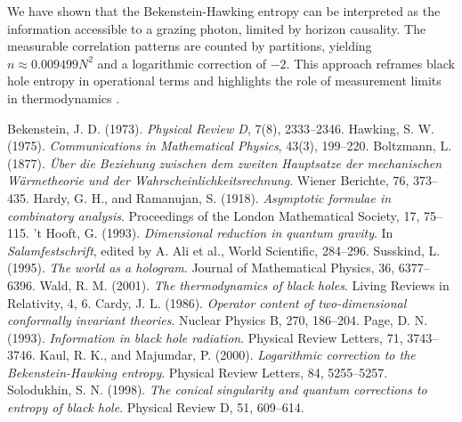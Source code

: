 \documentclass[12pt, letterpaper]{article}
\begin{document}
We have shown that the Bekenstein-Hawking entropy can be interpreted as the information accessible to a grazing photon, limited by horizon causality. The measurable correlation patterns are counted by partitions, yielding $n \approx 0.009499 N^2$ and a logarithmic correction of $-2$. This approach reframes black hole entropy in operational terms and highlights the role of measurement limits in thermodynamics \cite{boltzmann1877}.

\begin{thebibliography}{9}
 Bekenstein, J. D. (1973). \textit{Physical Review D}, 7(8), 2333–2346.
 Hawking, S. W. (1975). \textit{Communications in Mathematical Physics}, 43(3), 199–220.
 Boltzmann, L. (1877). \textit{Über die Beziehung zwischen dem zweiten Hauptsatze der mechanischen Wärmetheorie und der Wahrscheinlichkeitsrechnung}. Wiener Berichte, 76, 373–435.
 Hardy, G. H., and Ramanujan, S. (1918). \textit{Asymptotic formulae in combinatory analysis}. Proceedings of the London Mathematical Society, 17, 75–115.
 't Hooft, G. (1993). \textit{Dimensional reduction in quantum gravity}. In \textit{Salamfestschrift}, edited by A. Ali et al., World Scientific, 284–296.
 Susskind, L. (1995). \textit{The world as a hologram}. Journal of Mathematical Physics, 36, 6377–6396.
 Wald, R. M. (2001). \textit{The thermodynamics of black holes}. Living Reviews in Relativity, 4, 6.
 Cardy, J. L. (1986). \textit{Operator content of two-dimensional conformally invariant theories}. Nuclear Physics B, 270, 186–204.
 Page, D. N. (1993). \textit{Information in black hole radiation}. Physical Review Letters, 71, 3743–3746.
 Kaul, R. K., and Majumdar, P. (2000). \textit{Logarithmic correction to the Bekenstein-Hawking entropy}. Physical Review Letters, 84, 5255–5257.
 Solodukhin, S. N. (1998). \textit{The conical singularity and quantum corrections to entropy of black hole}. Physical Review D, 51, 609–614.
\end{thebibliography}
\end{document}
